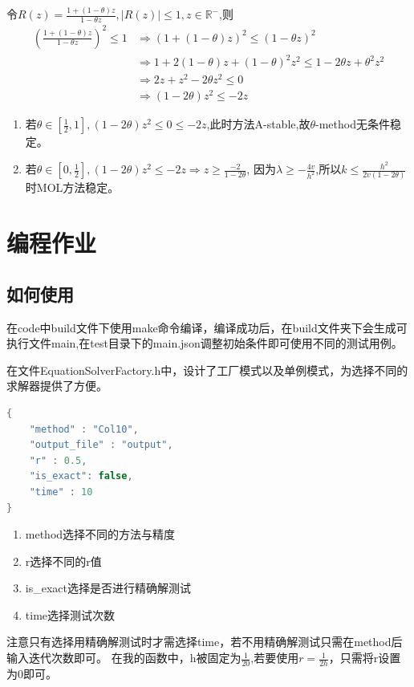 \documentclass[UTF8]{ctexart}
\begin{document}
令$R(z) = \frac{1+(1-\theta)z}{1-\theta z}, |R(z)|\leq 1, z\in \mathbb{R}^{-}$,则
\begin{equation}
    \begin{aligned}
        (\frac{1+(1-\theta)z}{1-\theta z})^2 \leq 1 &\Rightarrow (1+(1-\theta)z)^2 \leq (1-\theta z)^2 \\
                                                    &\Rightarrow 1 + 2(1-\theta)z + (1-\theta)^2z^2 \leq 1 - 2\theta z + \theta^2z^2 \\
                                                    &\Rightarrow 2z + z^2 -2\theta z^2 \leq 0 \\
                                                    &\Rightarrow (1 - 2\theta )z^2 \leq -2z
    \end{aligned}
\end{equation}
\begin{enumerate}
    \item 若$\theta \in [\frac{1}{2}, 1], (1-2\theta)z^2 \leq 0 \leq -2z$,此时方法A-stable,故$\theta$-method无条件稳定。
    \item 若$\theta \in [0, \frac{1}{2}] ,(1 - 2\theta )z^2 \leq -2z\Rightarrow z \geq \frac{-2}{1-2\theta}$,
          因为$\lambda \geq -\frac{4v}{h^2}$,所以$k \leq \frac{h^2}{2v(1-2\theta)}$时MOL方法稳定。
\end{enumerate}

\section*{编程作业}
\subsection*{如何使用}
在code中build文件下使用make命令编译，编译成功后，在build文件夹下会生成可执行文件main,在test目录下的main.json调整初始条件即可使用不同的测试用例。

在文件EquationSolverFactory.h中，设计了工厂模式以及单例模式，为选择不同的求解器提供了方便。
\begin{lstlisting}[language=C++]
{
    "method" : "Col10",
    "output_file" : "output",
    "r" : 0.5,
    "is_exact": false,
    "time" : 10
}
\end{lstlisting}

\begin{enumerate}
    \item method选择不同的方法与精度
    \item r选择不同的r值
    \item is\_exact选择是否进行精确解测试
    \item time选择测试次数
\end{enumerate}
注意只有选择用精确解测试时才需选择time，若不用精确解测试只需在method后输入迭代次数即可。
在我的函数中，h被固定为$\frac{1}{20}$,若要使用$r = \frac{1}{2h}$，只需将r设置为0即可。
\end{document}
